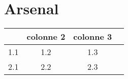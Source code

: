 \section{Arsenal}


\begin{tabular}{|c|c|c|c|}

\hline
 & colonne 2 & colonne 3 \\
\hline
1.1 & 1.2 & 1.3 \\
2.1 & 2.2 & 2.3 \\
\hline

\end{tabular}
